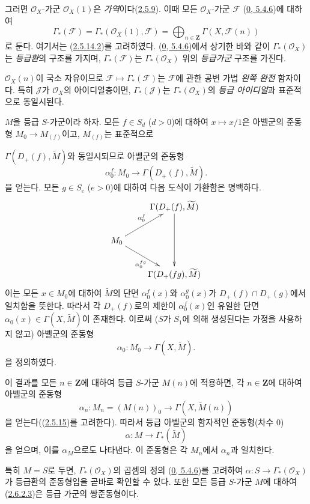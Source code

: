 \begin{env}[2.6.1]
\label{II.2.6.1-ko}
그러면 $\mathcal{O}_X$-가군 $\mathcal{O}_X(1)$은
\emph{가역}이다(\hyperref[II.2.5.9-ko]{2.5.9}). 이때 모든
$\mathcal{O}_X$-가군 $\mathcal{F}$
(\hyperref[0.5.4.6-ko]{0, 5.4.6})에 대하여
\[
\label{II.2.6.1.1-ko}
  \Gamma_*(\mathcal{F})
  =\Gamma_*(\mathcal{O}_X(1),\mathcal{F})
  =\bigoplus_{n\in\mathbf{Z}}\Gamma(X,\mathcal{F}(n))
\tag{2.6.1.1}
\]
로 둔다. 여기서는 (\hyperref[II.2.5.14.2-ko]{2.5.14.2})를 고려하였다.
(\hyperref[0.5.4.6-ko]{0, 5.4.6})에서 상기한 바와 같이
$\Gamma_*(\mathcal{O}_X)$는 \emph{등급환}의 구조를 가지며,
$\Gamma_*(\mathcal{F})$는 $\Gamma_*(\mathcal{O}_X)$ 위의
\emph{등급가군} 구조를 가진다.

$\mathcal{O}_X(n)$이 국소 자유이므로
$\mathcal{F}\mapsto\Gamma_*(\mathcal{F})$는 $\mathcal{F}$에 관한
공변 가법 \emph{왼쪽 완전} 함자이다. 특히 $\mathcal{J}$가
$\mathcal{O}_X$의 아이디얼층이면, $\Gamma_*(\mathcal{J})$는
$\Gamma_*(\mathcal{O}_X)$의 \emph{등급 아이디얼}과 표준적으로
동일시된다.
\end{env}

\begin{env}[2.6.2]
\label{II.2.6.2-ko}
$M$을 등급 $S$-가군이라 하자. 모든 $f\in S_d$ ($d>0$)에 대하여
$x\mapsto x/1$은 아벨군의 준동형 $M_0\to M_{(f)}$이고,
$M_{(f)}$는 표준적으로


$\Gamma(D_+(f),\widetilde{M})$와 동일시되므로 아벨군의 준동형
\[
  \alpha_0^f:M_0\longrightarrow\Gamma(D_+(f),\widetilde{M}).
\]
을 얻는다. 모든 $g\in S_e$ ($e>0$)에 대하여 다음 도식이 가환함은
명백하다.
\[
  \xymatrix{
    & \Gamma(D_+(f),\widetilde{M})\ar[dd]\\
    M_0\ar[ur]^{\alpha_0^f}\ar[dr]_{\alpha_0^{fg}}\\
    & \Gamma(D_+(fg),\widetilde{M})
  }
\]
이는 모든 $x\in M_0$에 대하여 $\widetilde{M}$의 단면
$\alpha_0^f(x)$와 $\alpha_0^g(x)$가 $D_+(f)\cap D_+(g)$에서
일치함을 뜻한다. 따라서 각 $D_+(f)$로의 제한이 $\alpha_0^f(x)$인
유일한 단면 $\alpha_0(x)\in\Gamma(X,\widetilde{M})$이 존재한다.
이로써 ($S$가 $S_1$에 의해 생성된다는 가정을 사용하지 않고) 아벨군의
준동형
\[
\label{II.2.6.2.1-ko}
  \alpha_0:M_0\longrightarrow\Gamma(X,\widetilde{M}).
\tag{2.6.2.1}
\]
을 정의하였다.

이 결과를 모든 $n\in\mathbf{Z}$에 대하여 등급 $S$-가군 $M(n)$에
적용하면, 각 $n\in\mathbf{Z}$에 대하여 아벨군의 준동형
\[
\label{II.2.6.2.2-ko}
  \alpha_n:M_n=(M(n))_0\longrightarrow\Gamma(X,\widetilde{M}(n))
\tag{2.6.2.2}
\]
을 얻는다((\hyperref[II.2.5.15-ko]{2.5.15})를 고려한다). 따라서 등급
아벨군의 함자적인 준동형(차수 $0$)
\[
\label{II.2.6.2.3-ko}
  \alpha:M\longrightarrow\Gamma_*(\widetilde{M})
\tag{2.6.2.3}
\]
을 얻으며, 이를 $\alpha_M$으로도 나타낸다. 이 준동형은 각 $M_n$에서
$\alpha_n$과 일치한다.

특히 $M=S$로 두면, $\Gamma_*(\mathcal{O}_X)$의 곱셈의 정의
(\hyperref[0.5.4.6-ko]{0, 5.4.6})를 고려하여
$\alpha:S\to\Gamma_*(\mathcal{O}_X)$가 등급환의 준동형임을 곧바로
확인할 수 있다. 또한 모든 등급 $S$-가군 $M$에 대하여
(\hyperref[II.2.6.2.3-ko]{2.6.2.3})은 등급 가군의 쌍준동형이다.
\end{env}

